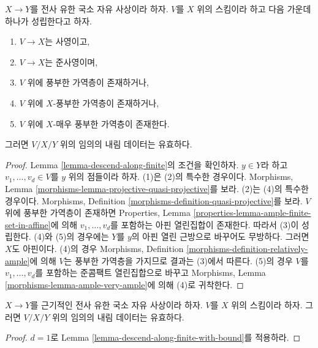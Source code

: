 \begin{lemma}
\label{lemma-descend-along-finite-quasi-projective}
$X \to Y$를 전사 유한 국소 자유 사상이라 하자. $V$를 $X$ 위의 스킴이라 하고 다음 가운데 하나가 성립한다고 하자.
\begin{enumerate}
\item $V \to X$는 사영이고,
\item $V \to X$는 준사영이며,
\item $V$ 위에 풍부한 가역층이 존재하거나,
\item $V$ 위에 $X$-풍부한 가역층이 존재하거나,
\item $V$ 위에 $X$-매우 풍부한 가역층이 존재한다.
\end{enumerate}
그러면 $V/X/Y$ 위의 임의의 내림 데이터는 유효하다.
\end{lemma}

\begin{proof}
Lemma \ref{lemma-descend-along-finite}의 조건을 확인하자. $y \in Y$라 하고
$v_1, \ldots, v_d \in V$를 $y$ 위의 점들이라 하자. (1)은 (2)의 특수한 경우이다.
Morphisms, Lemma \ref{morphisms-lemma-projective-quasi-projective}를 보라. (2)는 (4)의 특수한 경우이다.
Morphisms, Definition \ref{morphisms-definition-quasi-projective}를 보라. $V$ 위에 풍부한 가역층이 존재하면
Properties, Lemma \ref{properties-lemma-ample-finite-set-in-affine}에 의해 $v_1, \ldots, v_d$를 포함하는
아핀 열린집합이 존재한다. 따라서 (3)이 성립한다. (4)와 (5)의 경우에는 $Y$를 $y$의 아핀 열린 근방으로
바꾸어도 무방하다. 그러면 $X$도 아핀이다. (4)의 경우 Morphisms,
Definition \ref{morphisms-definition-relatively-ample}에 의해 $V$는 풍부한 가역층을 가지므로 결과는 (3)에서 따른다.
(5)의 경우 $V$를 $v_1, \ldots, v_d$를 포함하는 준콤팩트 열린집합으로 바꾸고 Morphisms,
Lemma \ref{morphisms-lemma-ample-very-ample}에 의해 (4)로 귀착한다.
\end{proof}

\begin{lemma}
\label{lemma-descend-along-finite-radicial}
$X \to Y$를 근기적인 전사 유한 국소 자유 사상이라 하자. $V$를 $X$ 위의 스킴이라 하자.
그러면 $V/X/Y$ 위의 임의의 내림 데이터는 유효하다.
\end{lemma}

\begin{proof}
$d = 1$로 Lemma \ref{lemma-descend-along-finite-with-bound}를 적용하라.
\end{proof}














